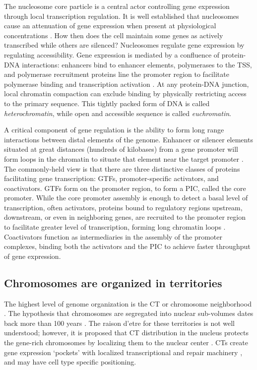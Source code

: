 The nucleosome core particle is a central actor controlling gene expression through local transcription regulation.  It is well established that nucleosomes
cause an attenuation of gene expression when present at physiological concentrations \citep{brown1984, lorch1987,laybourn1991,juan1994}. How
then does the cell maintain some genes as actively transcribed while others are silenced?  Nucleosomes regulate gene expression by regulating accessibility.
Gene expression is mediated by a confluence of protein-DNA interactions: enhancers bind to enhancer elements, polymerases to the \gls{TSS}, and polymerase
recruitment proteins line the promoter region to facilitate polymerase binding and transcription activation \citep{cox2008}.  At any protein-DNA junction,
local chromatin compaction can exclude binding by physically restricting access to the primary sequence.  This tightly packed form of DNA is called
\textit{\gls{heterochromatin}}, while open and accessible sequence is called \textit{\gls{euchromatin}}.

A critical component of gene regulation is the ability to form long range interactions between distal elements of the genome.  Enhancer or silencer elements
situated at great distances (hundreds of kilobases) from a gene promoter will form loops in the chromatin to situate that element near the target
promoter \citep{heintzman2007}.  The commonly-held view is that there are three distinctive classes of proteins facilitating gene transcription: \glspl{GTF},
promoter-specific activators, and coactivators.  \glspl{GTF} form on the promoter region, to form a \gls{PIC}, called the \gls{core promoter}.  While the
\gls{core promoter} assembly is enough to detect a basal level of transcription, often activators, proteins bound to regulatory regions upstream, downstream,
or even in neighboring genes, are recruited to the promoter region to facilitate greater level of transcription, forming long chromatin loops \citep{ptashne1997}.
Coactivators function as intermediaries in the assembly of the promoter complexes, binding both the activators and the \gls{PIC} to achieve faster throughput of
gene expression.

\subsection*{Chromosomes are organized in territories}

The highest level of genome organization is the \gls{CT} or chromosome neighborhood \citep{cremer2001}.  The hypothesis that chromosomes are segregated into
nuclear sub-volumes dates back more than 100 years \citep{cremer1993}.  The raison d'etre for these territories is not well understood; however, it is proposed
that \gls{CT} distribution in the nucleus protects the gene-rich chromosomes by localizing them to the nuclear center \citep{boyle2001, federico2006}.
\glspl{CT} create gene expression `pockets' with localized transcriptional and repair machinery \citep{bolzer2005}, and may have cell type specific positioning.

